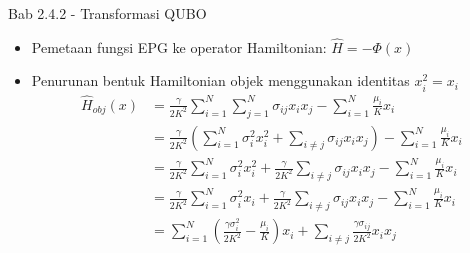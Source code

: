 \begin{frame}{Bab 2.4.2 - Transformasi QUBO}
    \begin{itemize}
        \item Pemetaan fungsi EPG ke operator Hamiltonian: $\hat{H} = -\Phi(x)$
        \item Penurunan bentuk Hamiltonian objek menggunakan identitas $x_i^2 = x_i$
        {\tiny
        \begin{equation}
            \begin{split}
            \hat{H}_{obj}(x) &= \frac{\gamma}{2K^2}\sum_{i=1}^N\sum_{j=1}^N \sigma_{ij} x_i x_j - \sum_{i=1}^N \frac{\mu_i}{K} x_i \\
            &= \frac{\gamma}{2K^2}\left(\sum_{i=1}^N\sigma_i^2 x_i^2 + \sum_{i\ne j}\sigma_{ij} x_ix_j\right) -\sum_{i=1}^N \frac{\mu_i}{K} x_i \\
            &= \frac{\gamma}{2K^2}\sum_{i=1}^N\sigma_i^2 x_i^2 + \frac{\gamma}{2K^2}\sum_{i\ne j}\sigma_{ij} x_ix_j - \sum_{i=1}^N \frac{\mu_i}{K} x_i \\
            &= \frac{\gamma}{2K^2}\sum_{i=1}^N\sigma_i^2 x_i + \frac{\gamma}{2K^2}\sum_{i\ne j}\sigma_{ij} x_ix_j - \sum_{i=1}^N \frac{\mu_i}{K} x_i \\
            &= \sum_{i=1}^N\left(\frac{\gamma \sigma_i^2}{2K^2} - \frac{\mu_i}{K}\right)x_i + \sum_{i\ne j}\frac{\gamma \sigma_{ij}}{2K^2} x_ix_j
            \end{split}
        \end{equation}
        }
    \end{itemize}
\end{frame}

